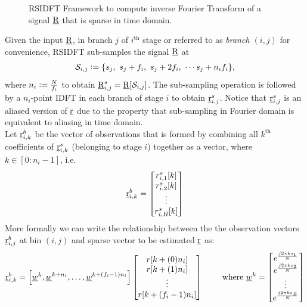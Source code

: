 \begin{enumerate}
	 \begin{figure}[h!]
	 	\begin{center}
	 	\resizebox{0.6\textwidth}{!}{}
	 	\end{center}	   
	 	\caption{ RSIDFT Framework to compute inverse Fourier Transform of a signal $\underline{\mathrm{R}}$ that is sparse in time domain. }\label{fig:rsidft}
	\vspace{5 pt}
	 \end{figure}
	 	
	 Given the input $\underline{\mathrm{R}}$, in branch $j$ of $i^{\text{th}}$ stage or referred to as \textit{branch $(i,j)$} for convenience, RSIDFT sub-samples the signal $\underline{\mathrm{R}}$ at
\begin{align}
\label{Eqn:SamplingSets}
	 \mathcal{S}_{i,j} \mathrel{\mathop:}= \{s_j,\ s_j + f_i,\ s_j + 2f_i,\ \cdots s_j + n_i f_i\},
\end{align}
where $n_i\mathrel{\mathop:}= \frac{N}{f_i}$ to obtain $\underline{\mathrm{R}}^{s}_{i,j}=\underline{\mathrm{R}}[\mathcal{S}_{i,j}]$. The sub-sampling operation is followed by a $n_i$-point IDFT in each branch of stage $i$ to obtain $ \underline{\mathrm{r}}^{s}_{i,j}$. Notice that $ \underline{\mathrm{r}}^{s}_{i,j}$ is an aliased version of $\underline{\mathrm{r}}$ due to the property that sub-sampling in Fourier domain is equivalent to aliasing in time domain.\\

	 Let $\underline{\mathrm{r}}^{b}_{i,k}$ be the  vector of observations that is formed by combining all $k^{\text{th}}$ coefficients of $\underline{\mathrm{r}}^{s}_{i,k}$ (belonging to stage $i$) together as a vector, where $k\in [0:n_i-1]$, i.e.
\[
	  \underline{\mathrm{r}}^{b}_{i,k} = \begin{bmatrix}
	 r^{s}_{i,1}[k] \\
	 r^{s}_{i,2}[k] \\
	 \vdots\\
	 r^{s}_{i,B}[k]
	 \end{bmatrix}  
\]
More formally we can write the relationship between the the observation vectors $\underline{\mathrm{r}}^b_{i,j}$ at bin $(i,j)$ and sparse vector to be estimated $\underline{\mathrm{r}}$ as:
\begin{align}
\label{Eqn:Generator Equation}
\underline{\mathrm{r}}^b_{i,k}=\left[\underline{w}^{k},\underline{w}^{k+n_i},\ldots, \underline{w}^{k+(f_i-1)n_i}\right]
\begin{bmatrix}
	 r[k+(0)n_i] \\
	 r[k+(1)n_i] \\
	 \vdots\\
	 r[k+(f_i-1)n_i]
\end{bmatrix}
\qquad \text{ where }   \underline{w}^{k}=
\begin{bmatrix}
e^{\frac{j2\pi ks_1}{N}}\\
e^{\frac{j2\pi ks_2}{N}}\\
\vdots\\
e^{\frac{j2\pi ks_B}{N}}
\end{bmatrix}
\end{align}


\end{enumerate}
